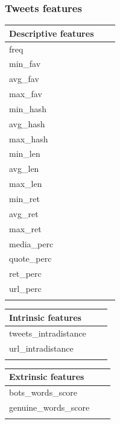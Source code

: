 \subsubsection{Tweets features}
\small
\begin{center}
	\begin{tabular}{lll}
		\textbf{Descriptive features}\\
		\hline\hline
		freq\\
		min\_fav\\
		avg\_fav\\
		max\_fav\\
		min\_hash\\
		avg\_hash\\
		max\_hash\\
		min\_len\\
		avg\_len\\
		max\_len\\
		min\_ret\\
		avg\_ret\\
		max\_ret\\
		media\_perc\\
		quote\_perc\\
		ret\_perc\\
		url\_perc\\\hline\\
	\end{tabular}
\end{center}

\begin{center}
	\begin{tabular}{lll}
		\textbf{Intrinsic features}\\
		\hline\hline
		tweets\_intradistance\\
		url\_intradistance\\\hline\\
	\end{tabular}
\end{center}


\begin{center}
	\begin{tabular}{lll}
		\textbf{Extrinsic features}\\
		\hline\hline
		bots\_words\_score\\
		genuine\_words\_score\\
		\hline\\
	\end{tabular}
\end{center}

\normalsize
